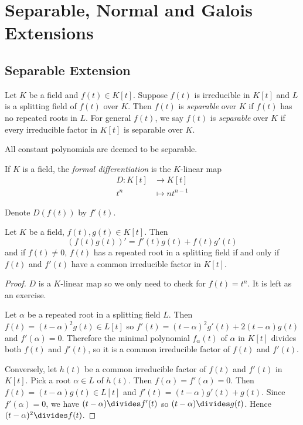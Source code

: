 \documentclass[a4paper]{article}
\begin{document}
\section{Separable, Normal and Galois Extensions}

\subsection{Separable Extension}

\begin{definition}
  Let \(K\) be a field and \(f(t) \in K[t]\). Suppose \(f(t)\) is irreducible in \(K[t]\) and \(L\) is a splitting field of \(f(t)\) over \(K\). Then \(f(t)\) is \emph{separable} over \(K\) if \(f(t)\) has no repeated roots in \(L\). For general \(f(t)\), we say \(f(t)\) is \emph{separable} over \(K\) if every irreducible factor in \(K[t]\) is separable over \(K\).

  All constant polynomials are deemed to be separable.
\end{definition}

\begin{definition}
  If \(K\) is a field, the \emph{formal differentiation} is the \(K\)-linear map 
  \begin{align*}
    D: K[t] &\to K[t] \\
    t^n &\mapsto n t^{n-1}
  \end{align*}
\end{definition}

\begin{notation}
  Denote \(D(f(t))\) by \(f'(t)\).
\end{notation}

\begin{lemma}
  \label{lem:formal derivative}
  Let \(K\) be a field, \(f(t), g(t) \in K[t]\). Then
  \[
    (f(t)g(t))' = f'(t)g(t) + f(t)g'(t)
  \]
  and if \(f(t) \neq 0\), \(f(t)\) has a repeated root in a splitting field if and only if \(f(t)\) and \(f'(t)\) have a common irreducible factor in \(K[t]\).
\end{lemma}

\begin{proof}
  \(D\) is a \(K\)-linear map so we only need to check for \(f(t) = t^n\). It is left as an exercise.

  Let \(\alpha\) be a repeated root in a splitting field \(L\). Then \(f(t) = (t - \alpha)^2 g(t) \in L[t]\) so \(f'(t) = (t - \alpha)^2g'(t) + 2(t - \alpha)g(t)\) and \(f'(\alpha) = 0\). Therefore the minimal polynomial \(f_\alpha(t)\) of \(\alpha\) in \(K[t]\) divides both \(f(t)\) and \(f'(t)\), so it is a common irreducible factor of \(f(t)\) and \(f'(t)\).

  Conversely, let \(h(t)\) be a common irreducible factor of \(f(t)\) and \(f'(t)\) in \(K[t]\). Pick a root \(\alpha \in L\) of \(h(t)\). Then \(f(\alpha) = f'(\alpha) = 0\). Then \(f(t) = (t - \alpha)g(t) \in L[t]\) and \(f'(t) = (t - \alpha)g'(t) + g(t)\). Since \(f'(\alpha) = 0\), we have \((t - \alpha) \divides f'(t)\) so \((t -\alpha) \divides g(t)\). Hence \((t - \alpha)^2 \divides f(t)\).
\end{proof}
\end{document}
